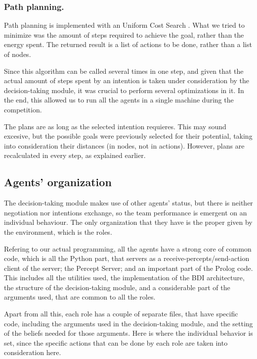 \documentclass{llncs2e/llncs}
\begin{document}
\subsubsection{Path planning.}

    Path planning is implemented with an Uniform Cost Search 
    \cite{Russell:2003:AIM:773294}. 
    What we tried to minimize was the amount of steps required to achieve the 
    goal, rather than the energy spent. 
    The returned result is a list of actions to be done, rather than a list of 
    nodes.
    
    Since this algorithm can be called several times in one step, and given that the 
    actual amount of steps spent by an intention is taken under consideration by 
    the decision-taking module, it was crucial to perform several optimizations in 
    it. In the end, this allowed us to run all the agents in a single machine  
    during the competition.
    
    The plans are as long as the selected intention requieres. This may 
    sound excesive, but the possible goals were previously selected for their 
    potential, taking into consideration their distances (in nodes, not in 
    actions). However, plans are recalculated in every step, as explained earlier.    

\subsection{Agents' organization}

    The decision-taking module makes use of other agents' status, but there is
    neither negotiation nor intentions exchange, so the team performance is
    emergent on an individual behaviour.  The only organization that they have
    is the proper given by the environment, which is the roles.
    
    Refering to our actual programming, all the agents have a strong core of
    common code, which is all the Python part, that servers as
    a receive-percepts/send-action client of the server; the Percept Server; and
    an important part of the Prolog code. This includes all the utilities used,
    the implementation of the BDI architecture, the structure of the
    decision-taking module, and a considerable part of the arguments used, that
    are common to all the roles.
        
    Apart from all this, each role has a couple of separate files, that have 
    specific code, including the arguments used in the decision-taking module, and
    the setting of the beliefs needed for those arguments. Here is where the 
    individual behavior is set, since the specific actions that can be done by each
    role are taken into consideration here.
    
\end{document}
